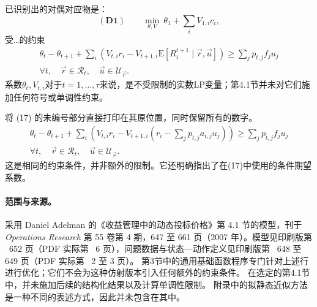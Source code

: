 \documentclass{article}
\begin{document}
已识别出的对偶对应物是：
\begin{equation}
(\mathbf{D1})\qquad
\min_{\theta,V}\ \theta_1+\sum_i V_{1,i}c_i,
\tag{16}
\end{equation}
受…的约束
\begin{equation}
\begin{split}
\theta_t-\theta_{t+1}
+\sum_i\left(V_{t,i}r_i
 -V_{t+1,i}\mathrm E[R_i^{t+1}\mid\vec r,\vec u]\right)
\geqslant\sum_j p_{t,j}f_j u_j\\
\forall t,\quad\vec r\in\mathscr R_t,\quad
\vec u\in\mathscr U_{\vec r}.
\end{split}
\tag{17}
\end{equation}
系数\(\theta_t,V_{t,i}\)对于\(t=1,\ldots,\tau\)来说，是不受限制的实数LP变量；第4.1节并未对它们施加任何符号或单调性约束。

将 (17) 的未编号部分直接打印在其原位置，同时保留所有的数字。
\[
\begin{split}
\theta_t-\theta_{t+1}
+\sum_i\left(
V_{t,i}r_i-V_{t+1,i}
\left(r_i-\sum_j p_{t,j}a_{i,j}u_j\right)
\right)
\geqslant\sum_j p_{t,j}f_j u_j\\
\forall t,\quad\vec r\in\mathscr R_t,\quad
\vec u\in\mathscr U_{\vec r}.
\end{split}
\]
这是相同的约束条件，并非额外的限制。它还明确指出了在(17)中使用的条件期望系数。

\paragraph{范围与来源。}
采用 Daniel Adelman 的《收益管理中的动态投标价格》第 4.1 节的模型，刊于 \emph{Operations Research} 第 55 卷第 4 期，647 至 661 页（2007 年）。模型见印刷版第 ~652 页（PDF 实际第 ~6 页），问题数据与状态—动作定义见印刷版第 ~648 至 649 页（PDF 实际第 ~2 至 3 页）。 第3节中的通用基础函数程序专门针对上述行进行优化；它们不会为这种仿射版本引入任何额外的约束条件。 在选定的第4.1节中，并未施加后续的结构化结果以及计算单调性限制。 附录中的拟静态近似方法是一种不同的表述方式，因此并未包含在其中。
\end{document}
